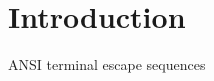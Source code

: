 \hypertarget{index_Introduction}{}\section{Introduction}\label{index_Introduction}
A\+N\+SI terminal escape sequences

 